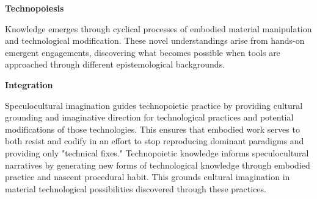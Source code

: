 \textbf{Technopoiesis}

Knowledge emerges through cyclical processes of embodied material manipulation and technological modification. These novel understandings arise from hands-on emergent engagements, discovering what becomes possible when tools are approached through different epistemological backgrounds.

\textbf{Integration}

Speculocultural imagination guides technopoietic practice by providing cultural grounding and imaginative direction for technological practices and potential modifications of those technologies. This ensures that embodied work serves to both resist and codify in an effort to stop reproducing dominant paradigms and providing only  "technical fixes." Technopoietic knowledge informs speculocultural narratives by generating new forms of technological knowledge through embodied practice and nascent procedural habit. This grounds cultural imagination in material technological possibilities discovered through these practices.

